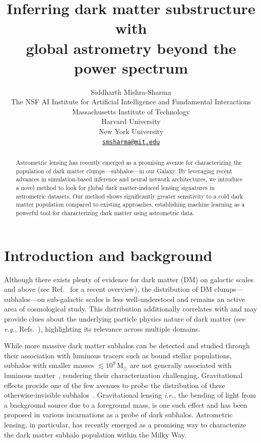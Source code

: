 \documentclass[]{article}
\title{Inferring dark matter substructure with \\ global astrometry beyond the power spectrum}
\author{
Siddharth Mishra-Sharma \\
The NSF AI Institute for Artificial Intelligence and Fundamental Interactions \\
Massachusetts Institute of Technology \\
Harvard University \\ 
New York University \\
\href{mailto:smsharma@mit.edu}{\texttt{smsharma@mit.edu}}  \\
}
\begin{document}
\newcommand{\eg}{\emph{e.g.}\xspace}
\newcommand{\ie}{\emph{i.e.}\xspace}
\newcommand{\diff}{\mathrm{d}}
\newcommand{\healpix}{\texttt{HEALPix}\xspace}
\newcommand{\deepsphere}{\texttt{DeepSphere}\xspace}

\maketitle

\begin{abstract}
Astrometric lensing has recently emerged as a promising avenue for characterizing the population of dark matter clumps---subhalos---in our Galaxy. By leveraging recent advances in simulation-based inference and neural network architectures, we introduce a novel method to look for global dark matter-induced lensing signatures in astrometric datasets. Our method shows significantly greater sensitivity to a cold dark matter population compared to existing approaches, establishing machine learning as a powerful tool for characterizing dark matter using astrometric data. 
\end{abstract}

\section{Introduction and background}
\label{sec:intro}

Although there exists plenty of evidence for dark matter (DM) on galactic scales and above (see Ref.~\cite{Green:2021jrr} for a recent overview), the distribution of DM clumps---subhalos---on sub-galactic scales is less well-understood and remains an active area of cosmological study. This distribution additionally correlates with and may provide clues about the underlying particle physics nature of dark matter (see \eg, Refs.~\cite{Schutz:2020jox,Bode:2000gq,Dalcanton:2000hn}), highlighting its relevance across multiple domains.

While more massive dark matter subhalos can be detected and studied through their association with luminous tracers such as bound stellar populations, subhalos with smaller masses $\lesssim 10^9\,\mathrm M_\odot$ are not generally associated with luminous matter~\citep{Fitts:2016usl,2017MNRAS.467.2019R}, rendering their characterization challenging. Gravitational effects provide one of the few avenues to probe the distribution of these otherwise-invisible subhalos~\citep{Buckley:2017ijx}. Gravitational lensing \ie, the bending of light from a background source due to a foreground mass, is one such effect and has been proposed in various incarnations as a probe of dark subhalos. 
Astrometric lensing, in particular, has recently emerged as a promising way to characterize the dark matter subhalo population within the Milky Way.
\end{document}
